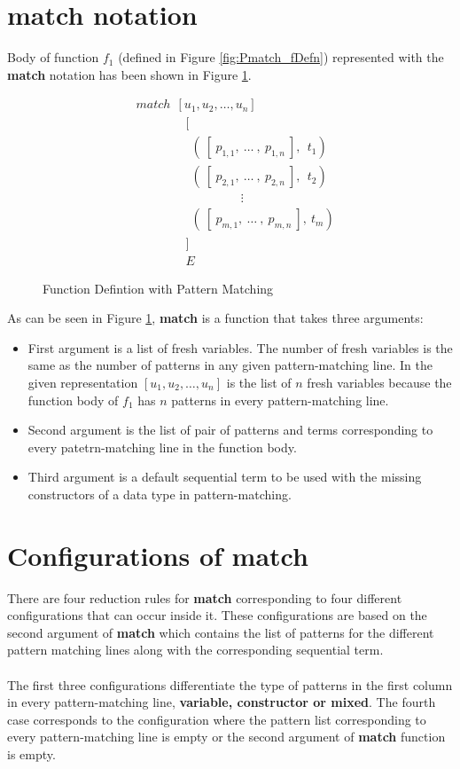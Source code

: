 \documentclass[11pt]{article}
\begin{document}
\section {match notation}\label{Pmatch:match}
Body of function $f_1$ (defined in Figure \ref {fig:Pmatch_fDefn}) represented with the {\bf match} notation has been shown in Figure \ref {fig:Pmatch_fDefn_match}.
\begin{figure}
\begin{align*} 
&match~~[u_1,u_2,\ldots,u_n] \\
&\qquad\qquad [\\
&\qquad\qquad ~~(~[~p_{1,1},~\ldots~, ~ p_{1,n}~],~~t_1) \\
&\qquad\qquad ~~(~[~p_{2,1},~\ldots~, ~ p_{2,n}~],~~t_2) \\
&\qquad\qquad ~~ \qquad\qquad \vdots\qquad\qquad  \\ 
&\qquad\qquad ~~(~[~p_{m,1},~\ldots~, ~ p_{m,n}~],~t_m) \\
&\qquad\qquad ]\\
&\qquad\qquad E
\end{align*} 
\caption{Function Defintion with Pattern Matching} \label{fig:Pmatch_fDefn_match}
\end{figure}
As can be seen in Figure \ref{fig:Pmatch_fDefn_match}, {\bf match} is a function that takes three arguments:
\begin{itemize}
  \item First argument is a list of fresh variables. The number of fresh variables is the same as the number of patterns in any given pattern-matching line. In the given representation $[u_1,u_2,\ldots,u_n]$ is the list of $n$ fresh variables because the function body of $f_1$ has $n$ patterns in every pattern-matching line.
  \item Second argument is the list of pair of patterns and terms corresponding to every patetrn-matching line in the function body.
  \item Third argument is a default sequential term to be used with the missing constructors of a data type in pattern-matching.
\end{itemize}

\section{Configurations of match}
There are four reduction rules for {\bf match} corresponding to four different configurations that can occur inside it. These configurations are based on the second argument of {\bf match} which contains the list of patterns for the different pattern matching lines along with the corresponding sequential term.
~~\\~~\\
The first three configurations differentiate the type of patterns in the first column in every pattern-matching line, {\bf variable, constructor or mixed}. The fourth case corresponds to the configuration where the pattern list corresponding to every pattern-matching line is empty or the second argument of {\bf match} function is empty.
\end{document}
